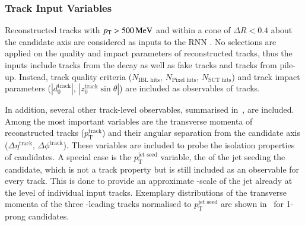 \subsubsection{Track Input Variables}

Reconstructed tracks with $p_{\text{T}} > \SI{500}{\ensuremath{\text{MeV}}}$ and within a cone of
$\Delta R < 0.4$ about the \tauhadvis candidate axis are considered as inputs to
the RNN \tauid. No selections are applied on the quality and impact parameters
of reconstructed tracks, thus the inputs include tracks from the \taulepton
decay as well as fake tracks and tracks from pile-up. Instead, track quality
criteria ($N_{\text{IBL hits}}$, $N_{\text{Pixel hits}}$, $N_{\text{SCT hits}}$)
and track impact parameters ($|d_0^{\text{track}}|$,
$|z_0^{\text{track}} \sin\theta|$) are included as observables of tracks.

In addition, several other track-level observables, summarised
in~, are included. Among the most important
variables are the transverse momenta of reconstructed tracks
($p_{\text{T}}^{\text{track}}$) and their angular separation from the \tauhadvis
candidate axis ($\Delta \eta^{\text{track}}$, $\Delta
\phi^{\text{track}}$). These variables are included to probe the isolation
properties of \tauhadvis candidates. A special case is the
$p_{\text{T}}^{\text{jet seed}}$ variable, the \pT of the jet seeding the
\tauhadvis candidate, which is not a track property but is still included as an
observable for every track. This is done to provide an approximate \pT-scale of
the jet already at the level of individual input tracks. Exemplary distributions
of the transverse momenta of the three \pT-leading tracks normalised to
$p_{\text{T}}^{\text{jet seed}}$ are shown
in~ for 1-prong \tauhadvis
candidates.%


